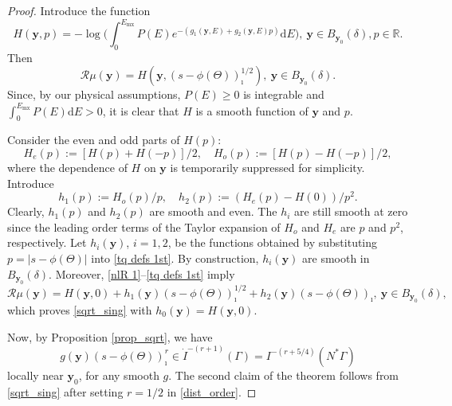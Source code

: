 \documentclass[10pt,a4paper]{amsart}
\newcommand{\CR}{\mathcal R}
\newcommand{\ac}[1]{\begin{quotation}\textbf{Sasha's comment:\
}{\textit{#1}}\end{quotation}}
\newcommand{\be}{\begin{equation}}
\newcommand{\br}{\mathbb{R}}
\newcommand{\dd}{\mathrm{d}}
\newcommand{\de}{\delta}
\newcommand{\ee}{\end{equation}}
\newcommand{\vy}{\mathbf{y}}
\begin{document}
\begin{proof}






Introduce the function
\be
H(\vy,p) = -\log\Big(\int_0^{E_{\mathrm{mx}}}P(E) e^{-(g_1(\vy,E) + g_2(\vy,E)p)} \dd E\Big),\ \vy\in B_{\vy_0}(\delta),p\in\br.
\ee
Then
\be
\label{nlR 1}
\CR\mu(\vy) = H(\vy,(s - \phi(\Theta))^{1/2}_\imath),\ \vy\in B_{\vy_0}(\delta).
\ee
Since, {by our physical assumptions,} $P(E) \geq 0$ is integrable {and $\int_0^{E_{\text{mx}}}P(E)\mathrm{d}E > 0$,} it is clear that $H$ is a smooth function of $\vy$ and $p$.  

Consider the even and odd parts of $H(p)$:
\be\label{tH 1st}
H_e(p):=[H(p)+H(-p)]/2,\quad
H_o(p):=[H(p)-H(-p)]/2,
\ee
where the dependence of $H$ on $\vy$ is temporarily suppressed for simplicity. Introduce
\be\label{tq defs 1st}
h_1(p):=H_o(p)/p,\quad h_2(p):=(H_e(p)-H(0))/p^2.
\ee
Clearly, $h_1(p)$ and $h_2(p)$ are smooth and even. The $h_i$ are still smooth at zero since the leading order terms of the Taylor expansion of $H_o$ and $H_e$ are $p$ and $p^2$, respectively. Let $h_i(\vy)$, $i=1,2$, be the functions obtained by substituting $p=|s - \phi(\Theta)|$ into \eqref{tq defs 1st}. By construction, $h_i(\vy)$ are smooth in $B_{\vy_0}(\de)$. Moreover, \eqref{nlR 1}--\eqref{tq defs 1st} imply
\be
\label{nlR 2}
\CR\mu(\vy) = H(\vy,0)+h_1(\vy)(s - \phi(\Theta))^{1/2}_\imath + h_2(\vy)(s - \phi(\Theta))_\imath,\ \vy\in B_{\vy_0}(\delta),
\ee
which proves \eqref{sqrt_sing} with $h_0(\vy)=H(\vy,0)$.

Now, by Proposition \ref{prop_sqrt}, we have 
\be
\label{dist_order}
g(\vy) (s - \phi(\Theta))^r_\imath \in \dot{I}^{-(r+1)}(\Gamma)=I^{-(r+5/4)}(N^*\Gamma)
\ee
locally near $\vy_0$, for any smooth $g$. The second claim of the theorem follows from \eqref{sqrt_sing} after setting $r = 1/2$ in \eqref{dist_order}.
\end{proof}
\end{document}
